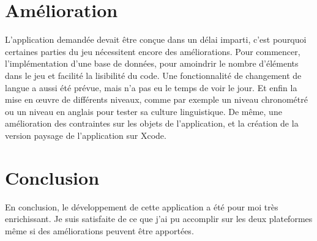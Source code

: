 \documentclass{article}
\begin{document}

\section{Amélioration}
L'application demandée devait être conçue dans un délai imparti, c'est pourquoi certaines parties du jeu nécessitent encore des améliorations.
Pour commencer, l'implémentation d'une base de données, pour amoindrir le nombre d'éléments dans le jeu et facilité la lisibilité du code. Une fonctionnalité de changement de langue a aussi été prévue, mais n'a pas eu le temps de voir le jour. Et enfin la mise en œuvre de différents niveaux, comme par exemple un niveau chronométré ou un niveau en anglais pour tester sa culture linguistique.
De même, une amélioration des contraintes sur les objets de l'application, et la création de la version paysage de l'application sur Xcode.

\section{Conclusion}
En conclusion, le développement de cette application a été pour moi très enrichissant. Je suis satisfaite de ce que j'ai pu accomplir sur les deux plateformes même si des améliorations peuvent être apportées.  
\newpage



\end{document}
